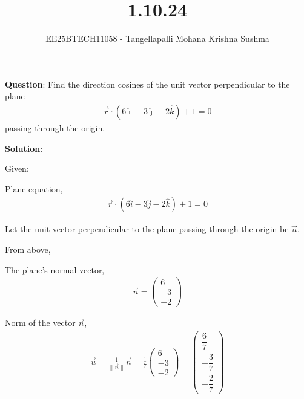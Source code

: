 \documentclass[journal]{IEEEtran}
\begin{document}

\vspace{3cm}

\title{1.10.24}
\author{EE25BTECH11058 - Tangellapalli Mohana Krishna Sushma}
{\let\newpage\relax\maketitle}

\renewcommand{\thefigure}{\theenumi}
\renewcommand{\thetable}{\theenumi}
\setlength{\intextsep}{10pt} %
\textbf{Question}:
 Find the direction cosines of the unit vector perpendicular to the plane
\begin{align*}
    \vec{r} \cdot (6\hat{\imath} - 3\hat{\jmath} - 2\hat{k}) + 1 = 0
\end{align*}
\hspace{1cm}passing through the origin.
\bigskip

\textbf{Solution}:

\vspace{8pt}

Given:

\vspace{8pt}

Plane equation, 
\begin{align}
    \vec{r} \cdot (6\hat{i} - 3\hat{j} - 2\hat{k}) + 1 = 0 
\end{align}

Let the unit vector perpendicular to the plane passing through the origin be $\vec{u}$.

From above,

The plane's normal vector,
\begin{align}
    \vec{n} = 
    \begin{pmatrix}
        6 \\
        -3 \\
        -2
    \end{pmatrix}
\end{align}

Norm of the vector $\vec{n}$,
\begin{align}
    \vec{u} = \frac{1}{\|\vec{n}\|} \vec{n} 
    = \frac{1}{7}
    \begin{pmatrix}
        6 \\[2pt]
        -3 \\[2pt]
        -2
    \end{pmatrix}
    =
    \begin{pmatrix}
        \dfrac{6}{7} \\[2pt]
        -\dfrac{3}{7} \\[2pt]
        -\dfrac{2}{7}
    \end{pmatrix}
\end{align}
\end{document}

